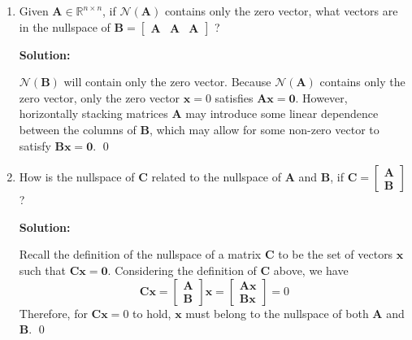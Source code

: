 \begin{enumerate}[label=(\alph*)]
	\item Given $\mathbf{A} \in \mathbb{R}^{n \times n}$, if
	      $\mathcal{N}(\mathbf{A})$ contains only the zero vector, what vectors
	      are in the nullspace of $\mathbf{B}=\left[\begin{array}{lll}
				      \mathbf{A} & \mathbf{A} & \mathbf{A}
			      \end{array}\right]$ ?

	      \par \textbf{Solution:}
	      \par $\mathcal{N}(\mathbf{B})$ will contain only
	      the zero vector. Because $\mathcal{N}(\mathbf{A})$ contains
	      only the zero vector, only the zero vector $\mathbf{x} = 0$ satisfies
	      $\mathbf{A}\mathbf{x} = \mathbf{0}$. However, horizontally stacking
          matrices $\mathbf{A}$ may introduce some linear dependence between the
          columns of $\mathbf{B}$, which may allow for some non-zero vector
          to satisfy $\mathbf{B}\mathbf{x} = \mathbf{0}$. 
	      \qed

	\item How is the nullspace of $\mathbf{C}$ related to the nullspace of
	      $\mathbf{A}$ and $\mathbf{B}$, if $\mathbf{C}=\left[\begin{array}{l}
				      \mathbf{A} \\
				      \mathbf{B}
			      \end{array}\right]$?

	      \par \textbf{Solution:}
	      \par Recall the definition of the nullspace of a
	      matrix $\mathbf{C}$ to be the set of vectors $\mathbf{x}$ such that
	      $\mathbf{Cx} = \mathbf{0}$. Considering the definition of $\mathbf{C}$
	      above, we have
	      $$
		      \mathbf{Cx} =
		      \left[\begin{array}{l}
				      \mathbf{A} \\
				      \mathbf{B}
			      \end{array}\right]
		      \mathbf{x} =
		      \left[\begin{array}{l}
				      \mathbf{Ax} \\
				      \mathbf{Bx}
			      \end{array}\right] = 0
	      $$
	      Therefore, for $\mathbf{Cx} = 0$ to hold, $\mathbf{x}$ must belong to
	      the nullspace of both $\mathbf{A}$ and $\mathbf{B}$.
	      \qed

\end{enumerate}
